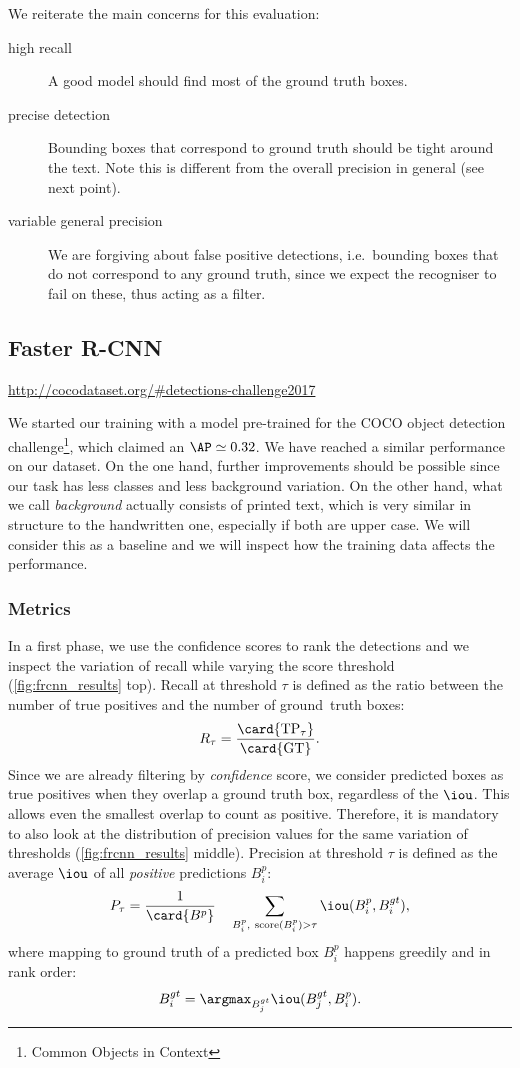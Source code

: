 	We reiterate the main concerns for this evaluation:
	\begin{description}
		\item[high recall] A good model should find most of the ground truth boxes.
		\item[precise detection] Bounding boxes that correspond to ground truth should be tight around the text. Note this is different from the overall precision in general (see next point).
		\item[variable general precision] We are forgiving about false positive detections, i.e.\ bounding boxes that do not correspond to any ground truth, since we expect the recogniser to fail on these, thus acting as a filter.
	\end{description}

	\subsection{Faster R-CNN}\label{sec:frcnn_results}
		\urldef{\cocoURL}\url{http://cocodataset.org/#detections-challenge2017}

		We started our training with a model pre-trained for the COCO object detection challenge\footnote{Common Objects in Context \cocoURL}, which claimed an \(\AP \simeq 0.32\). We have reached a similar performance on our  dataset. On the one hand, further improvements should be possible since our task has less classes and less background variation. On the other hand, what we call \emph{background} actually consists of printed text, which is very similar in structure to the handwritten one, especially if both are upper case. We will consider this as a baseline and we will inspect how the training data affects the performance.

		\subsubsection*{Metrics}
			In a first phase, we use the confidence scores to rank the detections and we inspect the variation of recall while varying the score threshold (\autoref{fig:frcnn_results} top). Recall at threshold \(\tau\) is defined as the ratio between the number of true positives and the number of \mbox{ground truth} boxes:
			\[
				R_{\tau} = \frac{\card{\operatorname{TP}_\tau}}{\card{\operatorname{GT}}}.
			\]
			Since we are already filtering by \emph{confidence} score, we consider predicted boxes as true positives when they overlap a ground truth box, regardless of the \(\iou\). This allows even the smallest overlap to count as positive. Therefore, it is mandatory to also look at the distribution of precision values for the same variation of thresholds (\autoref{fig:frcnn_results} middle). Precision at threshold \(\tau\) is defined as the average \(\iou\) of all \emph{positive} predictions \(B^p_i\):
			\[
					P_\tau = \frac{1}{\card{B^p}}~~~ \sum_{B^p_i,\ \operatorname{score}(B^p_i ) > \tau} \iou(B^p_i, B^{gt}_i),
			\]
			where mapping to ground truth of a predicted box \(B^p_i\) happens greedily and in rank order:
			\[
					B^{gt}_i = \argmax_{B^{gt}_j} \iou(B^{gt}_j, B^p_i).
			\]

